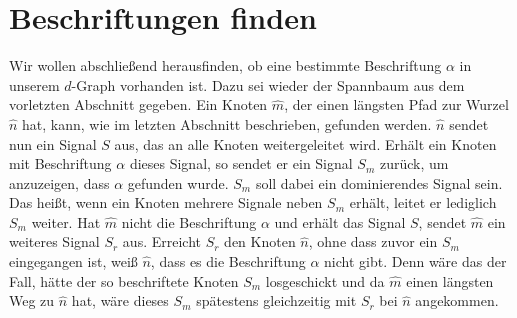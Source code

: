 \documentclass[11pt]{article}
\begin{document}
\section{Beschriftungen finden}

Wir wollen abschließend herausfinden, ob eine bestimmte Beschriftung $\alpha$ in unserem $d$-Graph vorhanden ist. Dazu sei wieder der Spannbaum aus dem vorletzten Abschnitt gegeben. Ein Knoten $\hat{m}$, der einen längsten Pfad zur Wurzel $\hat{n}$ hat, kann, wie im letzten Abschnitt beschrieben, gefunden werden. $\hat{n}$ sendet nun ein Signal $S$ aus, das an alle Knoten weitergeleitet wird. Erhält ein Knoten mit Beschriftung $\alpha$ dieses Signal, so sendet er ein Signal $S_m$ zurück, um anzuzeigen, dass $\alpha$ gefunden wurde. $S_m$ soll dabei ein dominierendes Signal sein. Das heißt, wenn ein Knoten mehrere Signale neben $S_m$ erhält, leitet er lediglich $S_m$ weiter. Hat $\hat{m}$ nicht die Beschriftung $\alpha$ und erhält das Signal $S$, sendet $\hat{m}$ ein weiteres Signal $S_r$ aus. Erreicht $S_r$ den Knoten $\hat{n}$, ohne dass zuvor ein $S_m$ eingegangen ist, weiß $\hat{n}$, dass es die Beschriftung $\alpha$ nicht gibt. Denn wäre das der Fall, hätte der so beschriftete Knoten $S_m$ losgeschickt und da $\hat{m}$ einen längsten Weg zu $\hat{n}$ hat, wäre dieses $S_m$ spätestens gleichzeitig mit $S_r$ bei $\hat{n}$ angekommen.
\printbibliography
\end{document}
